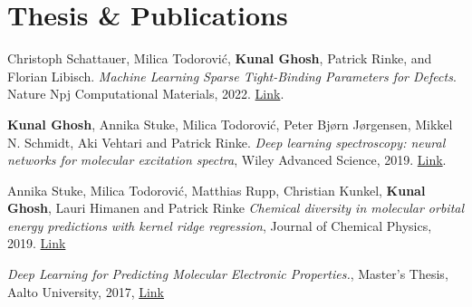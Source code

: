 \documentclass[]{deedy-resume}
\begin{document}
\begin{minipage}[t]{0.62\textwidth}
\sectionsep


\section{Thesis \& Publications} 
\renewcommand\refname{\vskip -1.5cm} %
%
%
\small{
\textbullet{}Christoph Schattauer, Milica Todorović, \textbf{Kunal Ghosh}, Patrick Rinke, and Florian Libisch. \textit{Machine Learning Sparse Tight-Binding Parameters for Defects}. Nature Npj Computational Materials, 2022. \href{https://doi.org/10.1038/s41524-022-00791-x.}{Link}.
\sectionsep

\textbullet{} \textbf{Kunal Ghosh}, Annika Stuke, Milica Todorovi\'c, Peter Bj{\o}rn J{\o}rgensen, Mikkel N. Schmidt, Aki Vehtari and Patrick Rinke.  \textit{Deep learning spectroscopy: neural networks for molecular excitation spectra}, Wiley Advanced Science, 2019. \href{https://onlinelibrary.wiley.com/doi/full/10.1002/advs.201801367}{Link}.
\sectionsep

\textbullet{} Annika Stuke, Milica Todorovi{\'{c}}, Matthias Rupp, Christian Kunkel, \textbf{Kunal Ghosh}, Lauri Himanen and Patrick Rinke  \textit{Chemical diversity in molecular orbital energy predictions with kernel ridge regression}, Journal of Chemical Physics, 2019. \href{https://aip.scitation.org/doi/10.1063/1.5086105}{Link}
\sectionsep

\textbullet{} \textit{Deep Learning for Predicting Molecular Electronic Properties.}, Master's Thesis, Aalto University, 2017, \href{http://urn.fi/URN:NBN:fi:aalto-201710307417}{Link}
}


\end{minipage}
\end{document}
